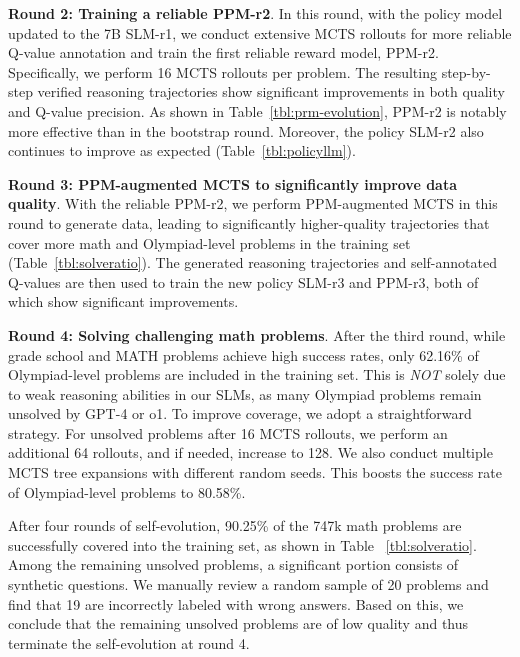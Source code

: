 \noindent\textbf{Round 2: Training a reliable PPM-r2}. In this round, with the policy model updated to the 7B SLM-r1, we conduct extensive MCTS rollouts for more reliable Q-value annotation and train the first reliable reward model, PPM-r2. Specifically, we perform 16 MCTS rollouts per problem. The resulting step-by-step verified reasoning trajectories show significant improvements in both quality and Q-value precision. As shown in Table~\ref{tbl:prm-evolution}, PPM-r2 is notably more effective than in the bootstrap round. Moreover,  the policy SLM-r2 also continues to improve as expected (Table~\ref{tbl:policyllm}).


 

\noindent\textbf{Round 3: PPM-augmented MCTS to significantly improve data quality}. With the reliable PPM-r2, we perform PPM-augmented MCTS in this round to generate data, leading to significantly higher-quality trajectories that cover more math and Olympiad-level problems in the training set (Table~\ref{tbl:solveratio}). The generated reasoning trajectories and self-annotated Q-values are then used to train the new policy SLM-r3 and PPM-r3, both of which show significant improvements. 

\noindent\textbf{Round 4: Solving challenging math problems}. After the third round, while grade school and MATH problems achieve high success rates, only 62.16\% of Olympiad-level problems are included in the training set. This is \emph{NOT} solely due to weak reasoning abilities in our SLMs, as many Olympiad problems remain unsolved by GPT-4 or o1. To improve coverage, we adopt a straightforward strategy. For unsolved problems after 16 MCTS rollouts, we perform an additional 64 rollouts, and if needed, increase to 128. We also conduct multiple MCTS tree expansions with different random seeds.  This  boosts the success rate of Olympiad-level problems to 80.58\%.





After four rounds of self-evolution, 90.25\% of the 747k math problems are successfully covered into the training set, as shown in Table ~\ref{tbl:solveratio}. Among the remaining unsolved problems, a significant portion consists of synthetic questions. We manually review a random sample of 20 problems and find that 19 are incorrectly labeled with  wrong answers. Based on this, we conclude that the remaining unsolved problems are of low quality and thus terminate the self-evolution at round 4. 

















